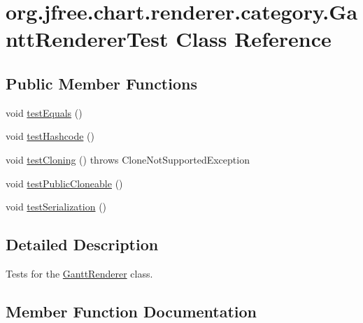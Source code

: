 \hypertarget{classorg_1_1jfree_1_1chart_1_1renderer_1_1category_1_1_gantt_renderer_test}{}\section{org.\+jfree.\+chart.\+renderer.\+category.\+Gantt\+Renderer\+Test Class Reference}
\label{classorg_1_1jfree_1_1chart_1_1renderer_1_1category_1_1_gantt_renderer_test}
\subsection*{Public Member Functions}
\begin{DoxyCompactItemize}
\item 
void \mbox{\hyperlink{classorg_1_1jfree_1_1chart_1_1renderer_1_1category_1_1_gantt_renderer_test_a0cca123a6246c3e2be66128f8a2b93ba}{test\+Equals}} ()
\item 
void \mbox{\hyperlink{classorg_1_1jfree_1_1chart_1_1renderer_1_1category_1_1_gantt_renderer_test_ad60c7ac08eed7eb37b7352dbdaf601e4}{test\+Hashcode}} ()
\item 
void \mbox{\hyperlink{classorg_1_1jfree_1_1chart_1_1renderer_1_1category_1_1_gantt_renderer_test_a2b3a2fdb34e8198e509ca3064ce82931}{test\+Cloning}} ()  throws Clone\+Not\+Supported\+Exception 
\item 
void \mbox{\hyperlink{classorg_1_1jfree_1_1chart_1_1renderer_1_1category_1_1_gantt_renderer_test_a4f9a411176fb90da63ddf929706eb378}{test\+Public\+Cloneable}} ()
\item 
void \mbox{\hyperlink{classorg_1_1jfree_1_1chart_1_1renderer_1_1category_1_1_gantt_renderer_test_a14e5d5074cc429ad0837abda33e6044b}{test\+Serialization}} ()
\end{DoxyCompactItemize}


\subsection{Detailed Description}
Tests for the \mbox{\hyperlink{classorg_1_1jfree_1_1chart_1_1renderer_1_1category_1_1_gantt_renderer}{Gantt\+Renderer}} class. 

\subsection{Member Function Documentation}
\mbox{\label{classorg_1_1jfree_1_1chart_1_1renderer_1_1category_1_1_gantt_renderer_test_a2b3a2fdb34e8198e509ca3064ce82931}} 

